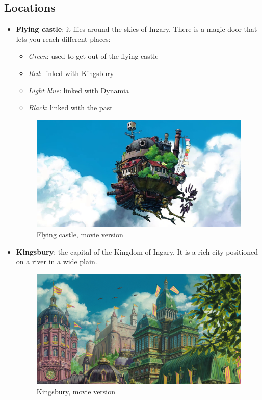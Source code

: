 \subsection{Locations}
\begin{itemize}
	\item \textbf{Flying castle}: it flies around the skies of Ingary. There is a magic door that lets you reach different places:
	\begin{itemize}
		\item \textit{Green}: used to get out of the flying castle
		\item \textit{Red}: linked with Kingsbury
		\item \textit{Light blue}: linked with Dynamia
		\item \textit{Black}: linked with the past
	\end{itemize}
	\begin{figure}[H]
	  \centering
	  \includegraphics[width=12cm]{../Images/Locations/flyingCastle}
	  \caption{Flying castle, movie version}
	\end{figure}
	
	\item \textbf{Kingsbury}: the capital of the Kingdom of Ingary. It is a rich city positioned on a river in a wide plain.
	\begin{figure}[H]
	  \centering
	  \includegraphics[width=12cm]{../Images/Locations/kingsbury}
	  \caption{Kingsbury, movie version}
	\end{figure}


\end{itemize}
